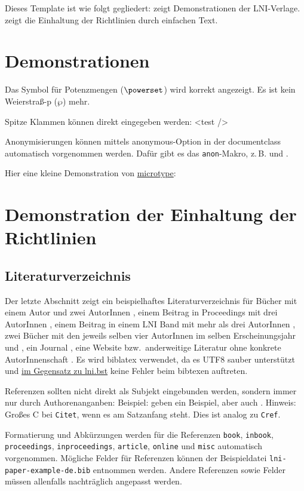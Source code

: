 \documentclass[utf8,biblatex]{lni}
\begin{document}
Dieses Template ist wie folgt gegliedert:
 zeigt Demonstrationen der LNI-Verlage.
 zeigt die Einhaltung der Richtlinien durch einfachen Text.

\section{Demonstrationen}
\label{sec:demos}
Das Symbol für Potenzmengen ($\powerset$) wird korrekt angezeigt.
Es ist kein Weierstraß-p ($\wp$) mehr.

Spitze Klammen können direkt eingegeben werden: <test />

Anonymisierungen können mittels anonymous-Option in der documentclass automatisch vorgenommen werden. Dafür gibt es das \texttt{anon}-Makro, z.\,B.  und .

Hier eine kleine Demonstration von \href{https://www.ctan.org/pkg/microtype}{microtype}:
\blindtext

\section{Demonstration der Einhaltung der Richtlinien}
\label{sec:lniconformance}

\subsection{Literaturverzeichnis}
Der letzte Abschnitt zeigt ein beispielhaftes Literaturverzeichnis für Bücher mit einem Autor \cite{Ez10} und zwei AutorInnen \cite{AB00}, einem Beitrag in Proceedings mit drei AutorInnen \cite{ABC01}, einem Beitrag in einem LNI Band mit mehr als drei AutorInnen \cite{Az09}, zwei Bücher mit den jeweils selben vier AutorInnen im selben Erscheinungsjahr \cite{Wa14} und \cite{Wa14b}, ein Journal \cite{Gl06}, eine Website \cite{GI19} bzw.\ anderweitige Literatur ohne konkrete AutorInnenschaft \cite{XX14}.
Es wird biblatex verwendet, da es UTF8 sauber unterstützt und \href{https://github.com/gi-ev/LNI/issues/5}{im Gegensatz zu lni.bst} keine Fehler beim bibtexen auftreten.

Referenzen sollten nicht direkt als Subjekt eingebunden werden, sondern immer nur durch Authorenanganben:
Beispiel:  geben ein Beispiel, aber auch \citet{Az09}.
Hinweis: Großes C bei \texttt{Citet}, wenn es am Satzanfang steht. Dies ist analog zu \texttt{Cref}.

Formatierung und Abkürzungen werden für die Referenzen \texttt{book}, \texttt{inbook}, \texttt{proceedings}, \texttt{inproceedings}, \texttt{article}, \texttt{online} und \texttt{misc} automatisch vorgenommen.
Mögliche Felder für Referenzen können der Beispieldatei \texttt{lni-paper-example-de.bib} entnommen werden.
Andere Referenzen sowie Felder müssen allenfalls nachträglich angepasst werden.
\end{document}
